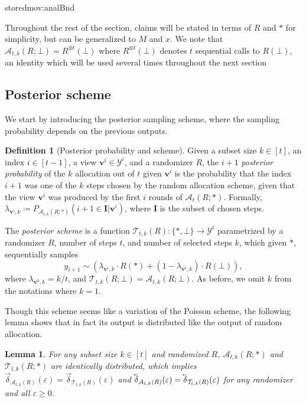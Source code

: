 \documentclass{article}
\newcommand{\showstored}[1]{\csname stored#1\endcsname}
\theoremstyle{plain}
\newtheorem{lemma}[theorem]{Lemma}
\theoremstyle{definition}
\newtheorem{definition}[theorem]{Definition}
\newcommand{\eps}{\varepsilon}
\newcommand{\lvec}[1]{\reflectbox{$\vec{\reflectbox{$#1$}}$}}
\newcommand{\out}{y}
\newcommand{\outDom}{\mathcal{Y}}
\newcommand{\alg}{M}
\newcommand{\rand}{R}
\newcommand{\view}{\boldsymbol{v}}
\newcommand{\alloc}[2]{\mathcal{A}_{#1}\left(#2\right)}
\newcommand{\allocFunc}[3]{\mathcal{A}_{#1}\left(#2; #3\right)}
\newcommand{\post}[2]{\mathcal{T}_{#1}\left(#2\right)}
\newcommand{\postFunc}[3]{\mathcal{T}_{#1}\left(#2; #3\right)}
\newcommand{\add}[1]{\lvec{#1}}
\newcommand{\rem}[1]{\vec{#1}}
\newcommand{\privProfAdd}[1]{\add{\delta}_{#1}}
\newcommand{\privProfRem}[1]{\rem{\delta}_{#1}}
\begin{document}
\showstored{mov:analBnd}

Throughout the rest of the section, claims will be stated in terms of $\rand$ and $*$ for simplicity, but can be generalized to $\alg$ and $x$. We note that $\allocFunc{t, k}{\rand}{\bot} = \rand^{\otimes t}(\bot)$ where $\rand^{\otimes t}(\bot)$ denotes $t$ sequential calls to $\rand(\bot)$, an identity which will be used several times throughout the next section

\subsection{Posterior scheme}
We start by introducing the posterior sampling scheme, where the sampling probability depends on the previous outputs. 
\begin{definition}[Posterior probability and scheme] \label{def:postSchem}
    Given a subset size $k \in [t]$, an index $i \in \left[t-1 \right]$, a view $\view^{i} \in \outDom^{i}$, and a randomizer $\rand$, the $i+1$ \emph{posterior probability} of the $k$ allocation out of $t$ given $\view^{i}$ is the probability that the index $i+1$ was one of the $k$ steps chosen by the random allocation scheme, given that the view $\view^{i}$ was produced by the first $i$ rounds of $\allocFunc{t}{\rand}{*}$. Formally, $\lambda_{\view^{i}, k} \coloneqq P_{\allocFunc{t, k}{\rand}{*}}\left(i+1 \in \boldsymbol{I} \vert \view^{i} \right)$, where $\boldsymbol{I}$ is the subset of chosen steps.

    The \emph{posterior scheme} is a function $\post{t, k}{\rand}: \{*, \bot\} \rightarrow \outDom^{t}$ parametrized by a randomizer $\rand$, number of steps $t$, and number of selected steps $k$, which given $*$, sequentially samples
    \[
        \out_{i+1} \sim \left(\lambda_{\view^{i}, k} \cdot \rand(*) + (1-\lambda_{\view^{i}, k}) \cdot \rand(\bot) \right), 
    \]
    where $\lambda_{\view^{0}, k} = k/t$, and $\postFunc{t, k}{\rand}{\bot} = \allocFunc{t, k}{\rand}{\bot}$.  As before, we omit $k$ from the notations where $k=1$.
\end{definition}

Though this scheme seems like a variation of the Poisson scheme, the following lemma shows that in fact its output is distributed like the output of random allocation.
\begin{lemma} \label{lem:postEqAlloc}
    For any subset size $k \in [t]$ and randomized $\rand$, $\allocFunc{t, k}{\rand}{*}$ and $\postFunc{t, k}{\rand}{*}$ are identically distributed, which implies $\privProfRem{\alloc{t, k}{\rand}}(\eps) = \privProfRem{\post{t, k}{\rand}}(\eps)$ and $\privProfAdd{\alloc{t, k}{\rand}}(\eps) = \privProfAdd{\post{t, k}{\rand}}(\eps)$ for any randomizer and all $\eps \ge 0$.
\end{lemma}
\end{document}
